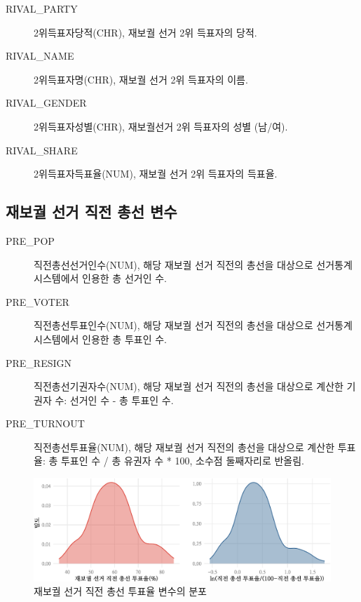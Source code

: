 \documentclass[
  11pt,
  letter]{article}
\begin{document}
\begin{description}
\item[RIVAL\_PARTY]
2위득표자당적(CHR), 재보궐 선거 2위 득표자의 당적.
\item[RIVAL\_NAME]
2위득표자명(CHR), 재보궐 선거 2위 득표자의 이름.
\item[RIVAL\_GENDER]
2위득표자성별(CHR), 재보궐선거 2위 득표자의 성별 (남/여).
\item[RIVAL\_SHARE]
2위득표자득표율(NUM), 재보궐 선거 2위 득표자의 득표율.
\end{description}

\hypertarget{uxc7acuxbcf4uxad90-uxc120uxac70-uxc9c1uxc804-uxcd1duxc120-uxbcc0uxc218}{%
\subsection{재보궐 선거 직전 총선
변수}\label{uxc7acuxbcf4uxad90-uxc120uxac70-uxc9c1uxc804-uxcd1duxc120-uxbcc0uxc218}}

\begin{description}
\item[PRE\_POP]
직전총선선거인수(NUM), 해당 재보궐 선거 직전의 총선을 대상으로
선거통계시스템에서 인용한 총 선거인 수.
\item[PRE\_VOTER]
직전총선투표인수(NUM), 해당 재보궐 선거 직전의 총선을 대상으로
선거통계시스템에서 인용한 총 투표인 수.
\item[PRE\_RESIGN]
직전총선기권자수(NUM), 해당 재보궐 선거 직전의 총선을 대상으로 계산한
기권자 수: 선거인 수 - 총 투표인 수.
\item[PRE\_TURNOUT]
직전총선투표율(NUM), 해당 재보궐 선거 직전의 총선을 대상으로 계산한
투표율: 총 투표인 수 / 총 유권자 수 * 100, 소수점 둘째자리로 반올림.
\end{description}

\begin{figure}
\centering
\includegraphics{Codebook_national_files/figure-latex/unnamed-chunk-12-1.pdf}
\caption{재보궐 선거 직전 총선 투표율 변수의 분포}
\end{figure}
\end{document}
